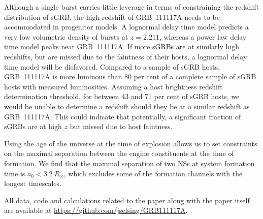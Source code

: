 \documentclass{aa}    %
\begin{document}
Although a single burst carries little leverage in terms of constraining the
redshift distribution of sGRB, the high redshift of GRB~111117A needs to be
accommodated in progenitor models. A lognormal delay time model predicts a very
low volumetric density of bursts at $z = 2.211$, whereas a power law delay time
model peaks near GRB~111117A. If more sGRBs are at similarly high redshifts, but
are missed due to the faintness of their hosts, a lognormal delay time model
will be disfavored. Compared to a sample of sGRB hosts, GRB~111117A is more
luminous than 80 per cent of a complete sample of sGRB hosts with measured
luminosities. Assuming a host brightness redshift determination threshold, for
between 43 and 71 per cent of sGRB hosts, we would be unable to determine a
redshift should they be at a similar redshift as GRB~111117A. This could
indicate that potentially, a significant fraction of sGRBs are at high $z$ but
missed due to host faintness.

Using the age of the universe at the time of explosion allows us to set
constraints on the maximal separation between the engine constituents at the
time of formation. We find that the maximal separation of two NSs at system
formation time is $a_0 < 3.2~R_\odot$, which excludes some of the formation
channels with the longest timescales.

All data, code and calculations related to the paper along with the
paper itself are available at \url{https://github.com/jselsing/GRB111117A}.
\end{document}
